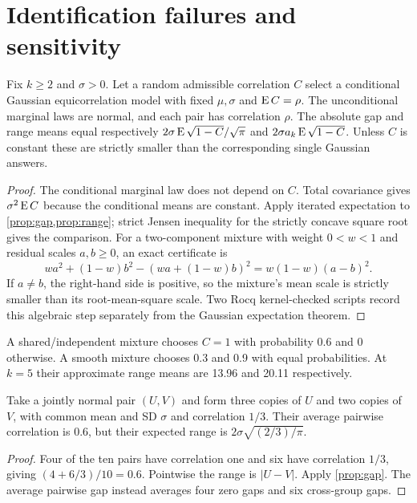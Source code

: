 \chapter{Identification failures and sensitivity}
\begin{proposition}\label{prop:mixtures}
Fix $k\ge2$ and $\sigma>0$. Let a random admissible correlation $C$ select a conditional Gaussian
equicorrelation model with fixed $\mu,\sigma$ and $\operatorname{E} C=\rho$.
The unconditional marginal laws are normal, and each pair has
correlation $\rho$. The absolute gap and range means equal respectively
$2\sigma\operatorname{E}\sqrt{1-C}/\sqrt\pi$ and $2\sigma a_k\operatorname{E}\sqrt{1-C}$.
Unless $C$ is constant these are strictly smaller than the corresponding
single Gaussian answers.
\end{proposition}
\begin{proof}
The conditional marginal law does not depend on $C$. Total covariance
gives $\sigma^2\operatorname{E} C$ because the conditional means are constant.
Apply iterated expectation to \cref{prop:gap,prop:range}; strict Jensen
inequality for the strictly concave square root gives the comparison.
For a two-component mixture with weight \(0<w<1\) and residual scales
\(a,b\ge0\), an exact certificate is
\[
 wa^2+(1-w)b^2-(wa+(1-w)b)^2=w(1-w)(a-b)^2.
\]
If \(a\ne b\), the right-hand side is positive, so the mixture's
mean scale is strictly smaller than its root-mean-square scale.
Two Rocq kernel-checked scripts record this algebraic step separately
from the Gaussian expectation theorem.
\end{proof}
A shared/independent mixture chooses $C=1$ with probability 0.6 and $0$
otherwise. A smooth mixture chooses 0.3 and 0.9 with equal probabilities.
At $k=5$ their approximate range means are 13.96 and 20.11 respectively.
\begin{proposition}\label{prop:block}
Take a jointly normal pair $(U,V)$ and form three copies of $U$ and two copies of $V$, with
common mean and SD $\sigma$ and correlation $1/3$. Their average
pairwise correlation is 0.6, but their expected range is
$2\sigma\sqrt{(2/3)/\pi}$.
\end{proposition}
\begin{proof}
Four of the ten pairs have correlation one and six have correlation
$1/3$, giving $(4+6/3)/10=0.6$. Pointwise the range is $|U-V|$.
Apply \cref{prop:gap}. The average pairwise gap instead averages
four zero gaps and six cross-group gaps.
\end{proof}
